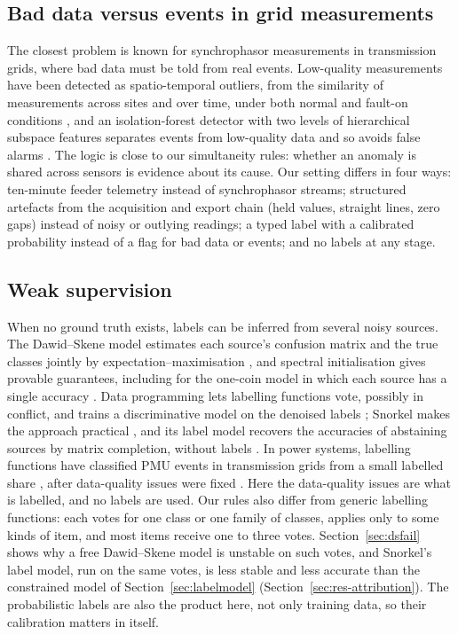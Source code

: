 \subsection{Bad data versus events in grid measurements}\label{sec:rw-pmu}

The closest problem is known for synchrophasor measurements in transmission grids, where bad data must be told from real events. Low-quality measurements have been detected as spatio-temporal outliers, from the similarity of measurements across sites and over time, under both normal and fault-on conditions \cite{wu2017lowquality}, and an isolation-forest detector with two levels of hierarchical subspace features separates events from low-quality data and so avoids false alarms \cite{wu2021iforest}. The logic is close to our simultaneity rules: whether an anomaly is shared across sensors is evidence about its cause. Our setting differs in four ways: ten-minute feeder telemetry instead of synchrophasor streams; structured artefacts from the acquisition and export chain (held values, straight lines, zero gaps) instead of noisy or outlying readings; a typed label with a calibrated probability instead of a flag for bad data or events; and no labels at any stage.

\subsection{Weak supervision}\label{sec:rw-ws}

When no ground truth exists, labels can be inferred from several noisy sources. The Dawid--Skene model estimates each source's confusion matrix and the true classes jointly by expectation--maximisation \cite{dawid1979}, and spectral initialisation gives provable guarantees, including for the one-coin model in which each source has a single accuracy \cite{zhang2016spectral}. Data programming lets labelling functions vote, possibly in conflict, and trains a discriminative model on the denoised labels \cite{ratner2016dataprogramming}; Snorkel makes the approach practical \cite{ratner2017snorkel}, and its label model recovers the accuracies of abstaining sources by matrix completion, without labels \cite{ratner2019metal}. In power systems, labelling functions have classified PMU events in transmission grids from a small labelled share \cite{liu2022weakly,liu2025automatic}, after data-quality issues were fixed \cite{liu2022weakly}. Here the data-quality issues are what is labelled, and no labels are used. Our rules also differ from generic labelling functions: each votes for one class or one family of classes, applies only to some kinds of item, and most items receive one to three votes. Section~\ref{sec:dsfail} shows why a free Dawid--Skene model is unstable on such votes, and Snorkel's label model, run on the same votes, is less stable and less accurate than the constrained model of Section~\ref{sec:labelmodel} (Section~\ref{sec:res-attribution}). The probabilistic labels are also the product here, not only training data, so their calibration matters in itself.

